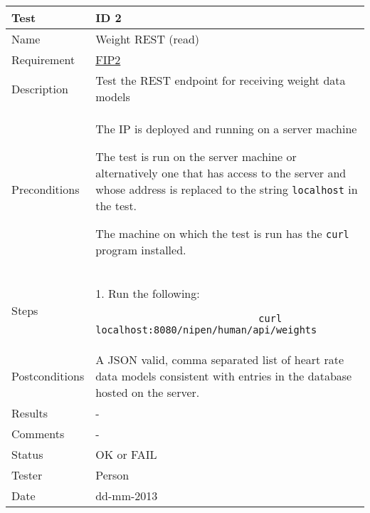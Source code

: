 \begin{table}
\begin{center}
\begin{tabular}{ | l | p{10cm} | }
	\hline
	\textbf{Test}	&	\textbf{ID 2} \\
	\hline\noalign{\smallskip}\noalign{\smallskip}\hline
	Name				& Weight REST (read) \\
	Requirement			& \hyperref[table:reqip]{FIP2} \\
	Description			& Test the REST endpoint for receiving weight data models \\
	Preconditions		&	\par The IP is deployed and running on a server machine
							\par The test is run on the server machine or alternatively
							one that has access to the server and whose address is replaced to the
							string \verb|localhost| in the test.
							\par The machine on which the test is run has the \verb|curl| program installed. \\
	Steps 				&	1. Run the following:
							\begin{verbatim}
							curl localhost:8080/nipen/human/api/weights
							\end{verbatim}
							\\
	Postconditions		& A JSON valid, comma separated list of heart rate data models consistent with 
							entries in the database hosted on the server. \\
	Results				& - \\
	Comments			& - \\
	Status				& OK or FAIL \\
	Tester				& Person \\
	Date				& dd-mm-2013 \\
	\hline
\end{tabular}
\end{center}
\end{table}

